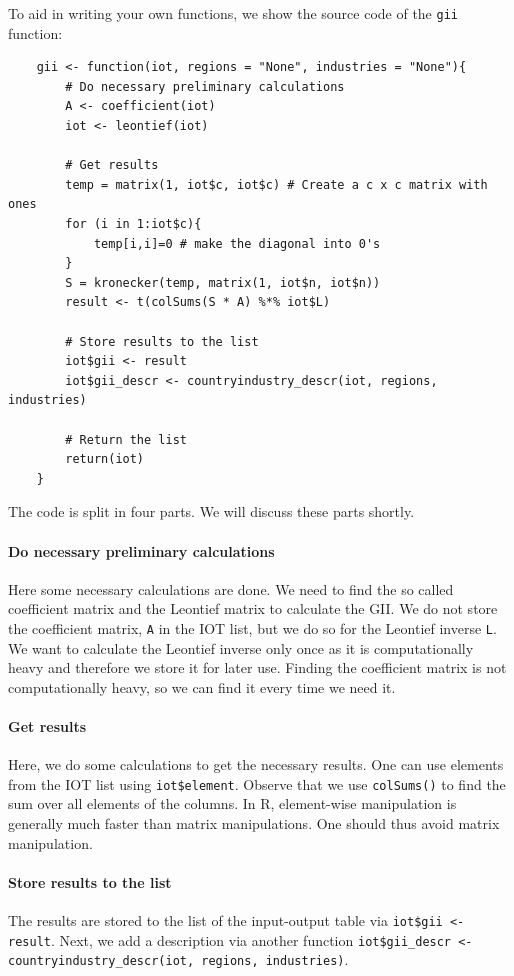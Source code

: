 \documentclass[10pt,a4paper]{paper}
\begin{document}
	To aid in writing your own functions, we show the source code of the \texttt{gii} function:
	\begin{Verbatim}
	gii <- function(iot, regions = "None", industries = "None"){
		# Do necessary preliminary calculations
		A <- coefficient(iot)
		iot <- leontief(iot)
	
		# Get results
		temp = matrix(1, iot$c, iot$c) # Create a c x c matrix with ones
		for (i in 1:iot$c){
			temp[i,i]=0 # make the diagonal into 0's
		}
		S = kronecker(temp, matrix(1, iot$n, iot$n)) 
		result <- t(colSums(S * A) %*% iot$L) 
		
		# Store results to the list
		iot$gii <- result	
		iot$gii_descr <- countryindustry_descr(iot, regions, industries)
		
		# Return the list
		return(iot)
	}	
	\end{Verbatim}
	The code is split in four parts. We will discuss these parts shortly.
	
	\paragraph{Do necessary preliminary calculations} Here some necessary calculations are done. We need to find the so called coefficient matrix and the Leontief matrix to calculate the GII. We do not store the coefficient matrix, \texttt{A} in the IOT list, but we do so for the Leontief inverse \texttt{L}. We want to calculate the Leontief inverse only once as it is computationally heavy and therefore we store it for later use. Finding the coefficient matrix is not computationally heavy, so we can find it every time we need it.
	
	\paragraph{Get results} Here, we do some calculations to get the necessary results. One can use elements from the IOT list using \texttt{iot\$element}. Observe that we use \texttt{colSums()} to find the sum over all elements of the columns. In R, element-wise manipulation is generally much faster than matrix manipulations. One should thus avoid matrix manipulation. 
	
	\paragraph{Store results to the list}
	The results are stored to the list of the input-output table via  \texttt{iot\$gii <- result}. Next, we add a description via another function \texttt{iot\$gii\_descr <- countryindustry\_descr(iot, regions, industries)}. 
	
\end{document}
